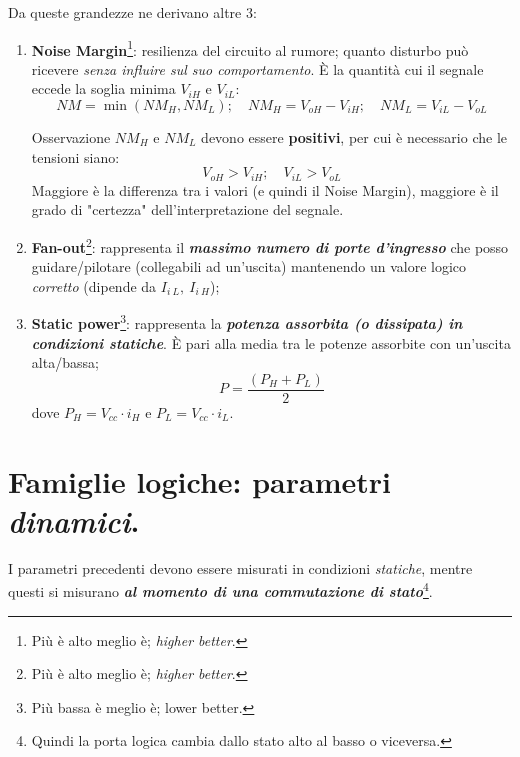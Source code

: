 \documentclass[
]{book}
\providecommand{\tightlist}{%
  \setlength{\itemsep}{0pt}\setlength{\parskip}{0pt}}
\begin{document}
Da queste grandezze ne derivano altre 3:

\begin{enumerate}
\def\labelenumi{\arabic{enumi})}
\setcounter{enumi}{3}
\tightlist
\item
  \textbf{Noise Margin}\footnote{Più è alto meglio è; \emph{higher
    better}.}: resilienza del circuito al rumore; quanto disturbo può
  ricevere \emph{senza influire sul suo comportamento}. È la quantità
  cui il segnale eccede la soglia minima \(V_{iH}\) e \(V_{iL}\): \[
   NM=\min(NM_{H}, NM_{L}); \quad NM_{H}=V_{oH}-V_{iH}; \quad NM_{L}=V_{iL}-V_{oL}
   \]

  \begin{bluebox}{Osservazione}
  $NM_{H}$ e $NM_{L}$ devono essere \textbf{positivi}, per cui è necessario che le tensioni siano:
  $$
  V_{oH}>V_{iH};\quad V_{iL}>V_{oL}
  $$
  Maggiore è la differenza tra i valori (e quindi il Noise Margin), maggiore è il grado di "certezza" dell'interpretazione del segnale.
  \end{bluebox}
\item
  \textbf{Fan-out}\footnote{Più è alto meglio è; \emph{higher better}.}:
  rappresenta il \textbf{\emph{massimo numero di porte d'ingresso}} che
  posso guidare/pilotare (collegabili ad un'uscita) mantenendo un valore
  logico \emph{corretto} (dipende da \(I_{i\:L},\:I_{i\:H}\));
\item
  \textbf{Static power}\footnote{Più bassa è meglio è; lower better.}:
  rappresenta la \textbf{\emph{potenza assorbita (o dissipata) in
  condizioni statiche}}. È pari alla media tra le potenze assorbite con
  un'uscita alta/bassa; \[
   P=\frac{(P_{H}+P_{L})}{2}
   \] dove \(P_H = V_{cc}\cdot i_H\) e \(P_L=V_{cc}\cdot i_L\).
\end{enumerate}

\section{\texorpdfstring{Famiglie logiche: parametri
\emph{dinamici}.}{Famiglie logiche: parametri dinamici.}}\label{famiglie-logiche-parametri-dinamici.}

I parametri precedenti devono essere misurati in condizioni
\emph{statiche}, mentre questi si misurano \textbf{\emph{al momento di
una commutazione di stato}}\footnote{Quindi la porta logica cambia dallo
  stato alto al basso o viceversa.}.
\end{document}
